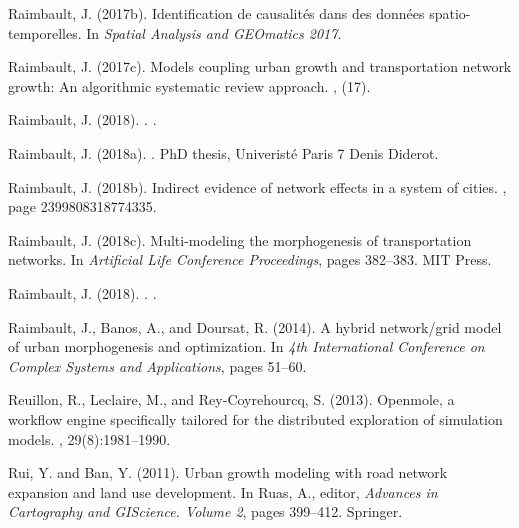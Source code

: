 \documentclass[11pt]{article}
\begin{document}
\begin{thebibliography}{}
Raimbault, J. (2017b).
\newblock Identification de causalit{\'e}s dans des donn{\'e}es
  spatio-temporelles.
\newblock In {\em Spatial Analysis and GEOmatics 2017}.

Raimbault, J. (2017c).
\newblock Models coupling urban growth and transportation network growth: An
  algorithmic systematic review approach.
, (17).

{Raimbault}, J. (2018).
.
.

Raimbault, J. (2018a).
.
\newblock PhD thesis, Univerist{\'e} Paris 7 Denis Diderot.

Raimbault, J. (2018b).
\newblock Indirect evidence of network effects in a system of cities.
,
  page 2399808318774335.

Raimbault, J. (2018c).
\newblock Multi-modeling the morphogenesis of transportation networks.
\newblock In {\em Artificial Life Conference Proceedings}, pages 382--383. MIT
  Press.

{Raimbault}, J. (2018).
.
.

Raimbault, J., Banos, A., and Doursat, R. (2014).
\newblock A hybrid network/grid model of urban morphogenesis and optimization.
\newblock In {\em 4th International Conference on Complex Systems and
  Applications}, pages 51--60.

Reuillon, R., Leclaire, M., and Rey-Coyrehourcq, S. (2013).
\newblock Openmole, a workflow engine specifically tailored for the distributed
  exploration of simulation models.
, 29(8):1981--1990.

Rui, Y. and Ban, Y. (2011).
\newblock Urban growth modeling with road network expansion and land use
  development.
\newblock In Ruas, A., editor, {\em Advances in Cartography and GIScience.
  Volume 2}, pages 399--412. Springer.


\end{thebibliography}
\end{document}
